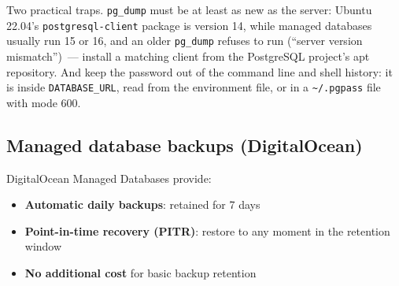 \begin{codebox}[short]

\begin{Shaded}
\begin{Highlighting}[]
  \DataTypeTok{\textbackslash{}}
    \OperatorTok{=}\DataTypeTok{\textbackslash{}}
    \OperatorTok{=}\VariableTok{$(}\VariableTok{)}

 \KeywordTok{|}  
\end{Highlighting}
\end{Shaded}

\end{codebox}

\noindent{}Two practical traps. \texttt{pg\_dump} must be at least as new as the server: Ubuntu 22.04's \texttt{postgresql-client} package is version 14, while managed databases usually run 15 or 16, and an older \texttt{pg\_dump} refuses to run (``server version mismatch'')~--- install a matching client from the PostgreSQL project's apt repository. And keep the password out of the command line and shell history: it is inside \texttt{DATABASE\_URL}, read from the environment file, or in a \texttt{\textasciitilde{}/.pgpass} file with mode 600.

\subsection*{Managed database backups (DigitalOcean)}\label{37-reliability:managed-database-backups-digitalocean}

DigitalOcean Managed Databases provide:

\begin{itemize}
\tightlist
\item
  \textbf{Automatic daily backups}: retained for 7 days
\item
  \textbf{Point-in-time recovery (PITR)}: restore to any moment in the retention window
\item
  \textbf{No additional cost} for basic backup retention
\end{itemize}

